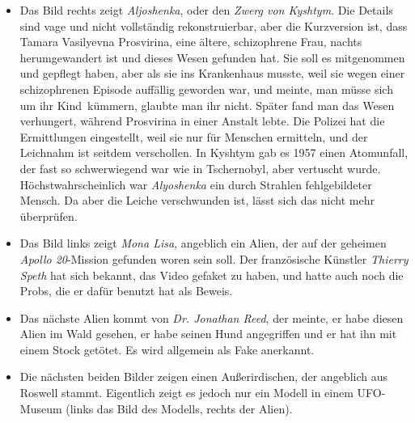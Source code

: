 \documentclass{scrartcl}
\begin{document}
\begin{itemize}
	\item Das Bild rechts zeigt \textit{Aljoshenka}, oder den \textit{Zwerg von Kyshtym}. Die Details sind vage und nicht vollständig rekonstruierbar, aber die Kurzversion ist, dass Tamara Vasilyevna Prosvirina, eine ältere, schizophrene Frau, nachts herumgewandert ist und dieses Wesen gefunden hat. Sie soll es mitgenommen und gepflegt haben, aber als sie ins Krankenhaus musste, weil sie wegen einer schizophrenen Episode auffällig geworden war, und meinte, man müsse sich um \frqq ihr Kind\flqq\ kümmern, glaubte man ihr nicht. Später fand man das Wesen verhungert, während Prosvirina in einer Anstalt lebte. Die Polizei hat die Ermittlungen eingestellt, weil sie \frqq nur für Menschen ermitteln\flqq, und der Leichnahm ist seitdem verschollen. In Kyshtym gab es 1957 einen Atomunfall, der fast so schwerwiegend war wie in Tschernobyl, aber vertuscht wurde. Höchstwahrscheinlich war \textit{Alyoshenka} ein durch Strahlen fehlgebildeter Mensch. Da aber die Leiche verschwunden ist, lässt sich das nicht mehr überprüfen.  
	\item Das Bild links zeigt \textit{Mona Lisa}, angeblich ein Alien, der auf der geheimen \textit{Apollo 20}-Mission gefunden woren sein soll. Der französische Künstler \textit{Thierry Speth} hat sich bekannt, das Video gefaket zu haben, und hatte auch noch die Probs, die er dafür benutzt hat als Beweis.



	\item Das nächste Alien kommt von \textit{Dr. Jonathan Reed}, der meinte, er habe diesen Alien im Wald gesehen, er habe seinen Hund angegriffen und er hat ihn mit einem Stock getötet. Es wird allgemein als Fake anerkannt.

	\item Die nächsten beiden Bilder zeigen einen \frqq Außerirdischen\flqq, der angeblich aus Roswell stammt. Eigentlich zeigt es jedoch nur ein Modell in einem UFO-Museum (links das Bild des Modells, rechts der \frqq Alien\flqq).


\end{itemize}
\end{document}
